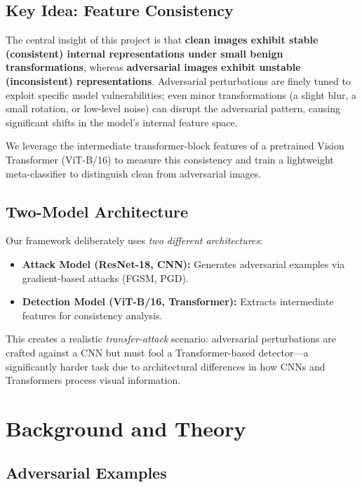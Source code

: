 \documentclass[12pt, a4paper]{article}
\begin{document}
\subsection{Key Idea: Feature Consistency}

The central insight of this project is that \textbf{clean images exhibit
stable (consistent) internal representations under small benign
transformations}, whereas \textbf{adversarial images exhibit unstable
(inconsistent) representations}. Adversarial perturbations are finely
tuned to exploit specific model vulnerabilities; even minor
transformations (a slight blur, a small rotation, or low-level noise) can
disrupt the adversarial pattern, causing significant shifts in the
model's internal feature space.

We leverage the intermediate transformer-block features of a pretrained
Vision Transformer (ViT-B/16) to measure this consistency and train a
lightweight meta-classifier to distinguish clean from adversarial images.

\subsection{Two-Model Architecture}

Our framework deliberately uses \emph{two different architectures}:
\begin{itemize}[nosep]
    \item \textbf{Attack Model (ResNet-18, CNN):} Generates adversarial
          examples via gradient-based attacks (FGSM, PGD).
    \item \textbf{Detection Model (ViT-B/16, Transformer):} Extracts
          intermediate features for consistency analysis.
\end{itemize}

This creates a realistic \emph{transfer-attack} scenario: adversarial
perturbations are crafted against a CNN but must fool a Transformer-based
detector---a significantly harder task due to architectural differences
in how CNNs and Transformers process visual information.

\section{Background and Theory}

\subsection{Adversarial Examples}
\end{document}
